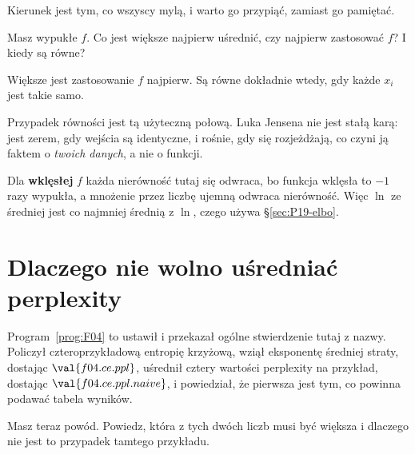 \begin{fr}
Kierunek jest tym, co wszyscy mylą, i warto go przypiąć, zamiast go pamiętać.

Masz wypukłe $f$. Co jest większe \dash{} najpierw uśrednić, czy najpierw
zastosować $f$? I kiedy są równe?
\nextframe
\end{fr}

\begin{fr}
\begin{ansblock}
Większe jest zastosowanie $f$ najpierw. Są równe dokładnie wtedy, gdy każde
$x_i$ jest takie samo.
\end{ansblock}

Przypadek równości jest tą użyteczną połową. Luka Jensena nie jest stałą karą:
jest zerem, gdy wejścia są identyczne, i rośnie, gdy się rozjeżdżają, co czyni
ją faktem o \emph{twoich danych}, a nie o funkcji.

\begin{note}
Dla \textbf{wklęsłej} $f$ każda nierówność tutaj się odwraca, bo funkcja
wklęsła to $-1$ razy wypukła, a mnożenie przez liczbę ujemną odwraca
nierówność. Więc $\ln$ ze średniej jest co najmniej średnią z $\ln$, czego
używa \S\ref{sec:P19-elbo}.
\end{note}
\end{fr}

\section{Dlaczego nie wolno uśredniać perplexity}
\label{sec:P19-perplexity}

\begin{fr}
Program~\ref{prog:F04} to ustawił i przekazał ogólne stwierdzenie tutaj z
nazwy. Policzył czteroprzykładową entropię krzyżową, wziął eksponentę średniej
straty, dostając $\val{f04.ce.ppl}$, uśrednił cztery wartości perplexity na
przykład, dostając $\val{f04.ce.ppl.naive}$, i powiedział, że pierwsza jest
tym, co powinna podawać tabela wyników.

Masz teraz powód. Powiedz, która z tych dwóch liczb musi być większa i
dlaczego nie jest to przypadek tamtego przykładu.
\dotline
\nextframe
\end{fr}


